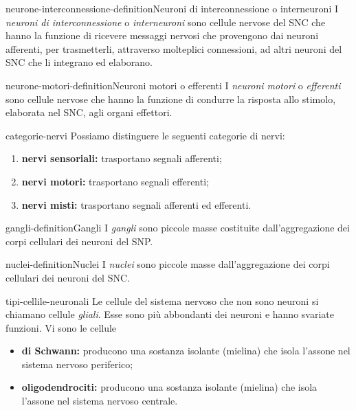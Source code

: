 \documentclass[preview]{standalone}
\begin{document}
\begin{snippetdefinition}{neurone-interconnessione-definition}{Neuroni di interconnessione o interneuroni}
    I \textit{neuroni di interconnessione} o \textit{interneuroni} sono
    cellule nervose del SNC che hanno la funzione di ricevere messaggi nervosi che
    provengono dai neuroni afferenti, per trasmetterli, attraverso molteplici connessioni, ad altri
    neuroni del SNC che li integrano ed elaborano.
\end{snippetdefinition}

\begin{snippetdefinition}{neurone-motori-definition}{Neuroni motori o efferenti}
    I \textit{neuroni motori} o \textit{efferenti} sono
    cellule nervose che hanno la funzione di condurre la risposta allo stimolo, elaborata nel
    SNC, agli organi effettori.
\end{snippetdefinition}

\begin{snippet}{categorie-nervi}
    Possiamo distinguere le seguenti categorie di nervi:
    \begin{enumerate}
        \item \textbf{nervi sensoriali:} trasportano segnali afferenti;
        \item \textbf{nervi motori:} trasportano segnali efferenti;
        \item \textbf{nervi misti:} trasportano segnali afferenti ed efferenti.
    \end{enumerate}
\end{snippet}

\begin{snippetdefinition}{gangli-definition}{Gangli}
    I \textit{gangli} sono piccole masse
    costituite dall'aggregazione dei corpi cellulari dei neuroni del SNP.
\end{snippetdefinition}

\begin{snippetdefinition}{nuclei-definition}{Nuclei}
    I \textit{nuclei} sono piccole masse
    dall'aggregazione dei corpi cellulari dei neuroni del SNC.
\end{snippetdefinition}

\begin{snippet}{tipi-cellile-neuronali}
    Le cellule del sistema nervoso che non sono neuroni si chiamano cellule \textit{gliali}.
    Esse sono più abbondanti dei neuroni e hanno svariate funzioni.
    Vi sono le cellule
    \begin{itemize}
        \item \textbf{di Schwann:} producono una sostanza isolante (mielina) che isola l'assone nel sistema nervoso periferico;
        \item \textbf{oligodendrociti:} producono una sostanza isolante (mielina) che isola l'assone nel sistema nervoso centrale.
    \end{itemize}
\end{snippet}
\end{document}
